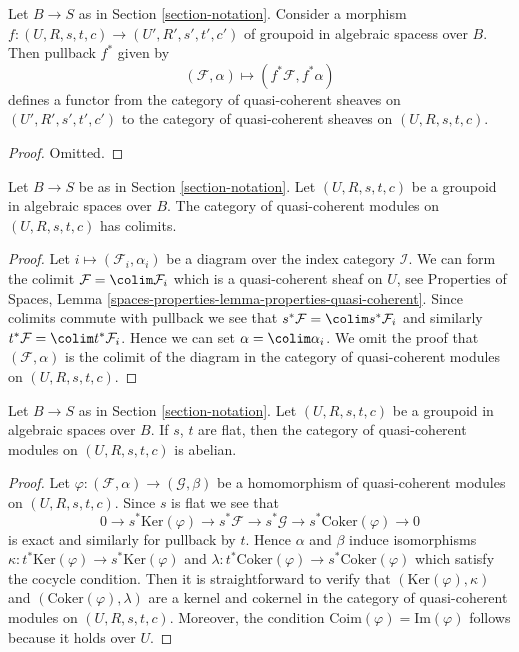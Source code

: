 \begin{lemma}
\label{lemma-pullback}
Let $B \to S$ as in Section \ref{section-notation}.
Consider a morphism
$f : (U, R, s, t, c) \to (U', R', s', t', c')$
of groupoid in algebraic spacess over $B$. Then pullback $f^*$ given by
$$
(\mathcal{F}, \alpha) \mapsto (f^*\mathcal{F}, f^*\alpha)
$$
defines a functor from the category of quasi-coherent sheaves on
$(U', R', s', t', c')$ to the category of quasi-coherent sheaves on
$(U, R, s, t, c)$.
\end{lemma}

\begin{proof}
Omitted.
\end{proof}

\begin{lemma}
\label{lemma-colimits}
Let $B \to S$ be as in Section \ref{section-notation}.
Let $(U, R, s, t, c)$ be a groupoid in algebraic spaces over $B$.
The category of quasi-coherent modules on $(U, R, s, t, c)$ has colimits.
\end{lemma}

\begin{proof}
Let $i \mapsto (\mathcal{F}_i, \alpha_i)$ be a diagram over the index
category $\mathcal{I}$. We can form the colimit
$\mathcal{F} = \colim \mathcal{F}_i$
which is a quasi-coherent sheaf on $U$, see
Properties of Spaces, Lemma
\ref{spaces-properties-lemma-properties-quasi-coherent}.
Since colimits commute with pullback we see that
$s^*\mathcal{F} = \colim s^*\mathcal{F}_i$ and similarly
$t^*\mathcal{F} = \colim t^*\mathcal{F}_i$. Hence we can set
$\alpha = \colim \alpha_i$. We omit the proof that $(\mathcal{F}, \alpha)$
is the colimit of the diagram in the category of quasi-coherent modules
on $(U, R, s, t, c)$.
\end{proof}

\begin{lemma}
\label{lemma-abelian}
Let $B \to S$ as in Section \ref{section-notation}.
Let $(U, R, s, t, c)$ be a groupoid in algebraic spaces over $B$.
If $s$, $t$ are flat, then the category of quasi-coherent modules on
$(U, R, s, t, c)$ is abelian.
\end{lemma}

\begin{proof}
Let $\varphi : (\mathcal{F}, \alpha) \to (\mathcal{G}, \beta)$ be a
homomorphism of quasi-coherent modules on $(U, R, s, t, c)$. Since $s$ is flat
we see that
$$
0 \to s^*\text{Ker}(\varphi)
\to s^*\mathcal{F} \to s^*\mathcal{G} \to s^*\text{Coker}(\varphi) \to 0
$$
is exact and similarly for pullback by $t$. Hence $\alpha$ and $\beta$
induce isomorphisms
$\kappa : t^*\text{Ker}(\varphi) \to s^*\text{Ker}(\varphi)$ and
$\lambda : t^*\text{Coker}(\varphi) \to s^*\text{Coker}(\varphi)$
which satisfy the cocycle condition. Then it is straightforward to
verify that $(\text{Ker}(\varphi), \kappa)$ and
$(\text{Coker}(\varphi), \lambda)$ are a kernel and cokernel in the
category of quasi-coherent modules on $(U, R, s, t, c)$. Moreover,
the condition $\text{Coim}(\varphi) = \text{Im}(\varphi)$ follows
because it holds over $U$.
\end{proof}





